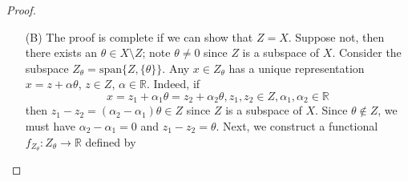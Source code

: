 \documentclass[11pt,a4paper]{article}
\begin{document}
\begin{proof}
\begin{enumerate}
\begin{proof}
\begin{itemize}
                Also, with $f_W(u) = f_{Z_{\alpha_1}}(u)$ and $f_W(v) = f_{Z_{\alpha_2}} (v)$,
                \begin{align*}
                    f_w(\beta u + \gamma v) &= f_{Z_{\alpha_2}}(\beta u + \gamma v)\\
                    &= \beta f_{Z_{\alpha_2}}(u) + \gamma f_{Z_{\alpha_2}}(v) \text{  linearity}\\
                    &= \beta f_{Z_{\alpha_1}}(u) + \gamma f_{Z_{\alpha_2}}(v) \text{  because in same chain}\\
                    &= \beta f_{Z_{W}}(u) + \gamma f_{Z_{W}}(v) 
                \end{align*}
                The case $Z_{\alpha_2} \subset Z_{\alpha_1}$ follows from a symmetric argument.
                \item Choose any $w \in W$,then $w \in Z_{\alpha}$ for some $\alpha \in \Lambda$ and
                $$
                    f_W(w) = f_{Z_{\alpha}}(w) \leq p(w)\  \text{since}\  (w,Z_{\alpha}) \in M
                $$
            \end{itemize}
            
            Hence, $(W,f_W)$ is an element of $M$ and an upper bound of $C$ since $(Z_{\alpha},f_{Z_\alpha}) \leq (W,f_W)$ for all $\alpha in \Lambda$. Since $C$ was an arbitrary chain in $M$, by Zorn’s lemma, $M$ has a maximal element $(Z,f_Z) \in M$, and $f_Z$ is (by definition) a linear extension of $f$ satisfying $f_Z(z) \leq p(z)$ for all $z \in Z$.
        \end{proof}
        
            \item[(B)] The proof is complete if we can show that $Z = X$. Suppose not, then there exists an $\theta \in X \setminus Z$; note $ \theta \neq 0$ since $Z$ is a subspace of $X$. Consider the subspace $Z_\theta = \text{span}\{Z,\{\theta\}\}$. Any $x \in Z_\theta$ has a unique representation $x = z + \alpha \theta$, $z \in Z$, $\alpha \in \mathbb{R}$. Indeed, if
            $$
                x = z_1 + \alpha_1 \theta = z_2 + \alpha_2 \theta, z_1, z_2 \in Z, \alpha_1, \alpha_2 \in \mathbb{R}
            $$
            then $z_1 - z_2 =(\alpha_2 - \alpha_1) \theta \in Z$ since $Z$ is a subspace of $X$. Since $\theta \notin Z$, we must have $\alpha_2 - \alpha_1 = 0$ and $z_1 - z_2 = \theta$. Next, we construct a functional $f_{Z_{\theta}} : Z_{\theta} \to \mathbb{R}$ defined by
            

\end{enumerate}
\end{proof}
\end{document}
